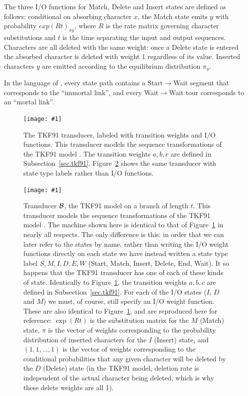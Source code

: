\documentclass{article}
\newcommand{\secref}[1]{Subsection~\ref{sec.#1}}
\newcommand{\figref}[1]{Figure~\ref{Figures.#1}}
\newcommand{\figlabel}[1]{\label{Figures.#1}}
\newcommand{\easyfig}[4]{
\begin{figure}
\texttt{[image: \#1]}
\caption{ \figlabel{#3} #4}
\end{figure}}
\newcommand{\widepdffig}[2]{\easyfig{#1-fig.pdf}{width=\textwidth}{#1}{#2}}
\newcommand\tkf{{\cal B}}
\begin{document}
The three I/O functions for Match, Delete and Insert states are defined as follows:
conditional on absorbing character $x$, the Match state emits  $y$ with probability
$exp(Rt)_{xy}$, where $R$ is the rate matrix governing character substitutions and 
$t$ is the time separating the input and output sequences. 
Characters are all deleted with the same weight: once a Delete state is entered the 
absorbed character is deleted with weight 1 regardless of its value.  
Inserted characters $y$ are emitted according to the equilibrium distribution $\pi_y$.

In the language of \cite{ThorneEtal91}, every state path contains a Start$\to$Wait segment that corresponds to the ``immortal link'',
and every Wait$\to$Wait tour corresponds to an ``mortal link''.

\widepdffig{tkf91}{The TKF91 transducer, labeled with transition weights and I/O functions.  
This transducer models the sequence transformations of the TKF91 model \cite{ThorneEtal91}.
The transition weights $a,b,c$ are defined in \secref{tkf91}.
\figref{tkf91-labeled} shows the same transducer with state type labels rather than I/O functions.}



\widepdffig{tkf91-labeled}{
Transducer $\tkf$, the TKF91 model on a branch of length $t$.
This transducer models the sequence transformations of the TKF91 model \cite{ThorneEtal91}.
The machine shown here is identical to that of \figref{tkf91} in nearly all respects.
The only difference is this: in order that we can later refer to the states by name,
rather than writing the I/O weight functions directly on each state
we have instead written a state type label
 $S,M,I,D,E,W$ (Start, Match, Insert, Delete, End, Wait).
It so happens that the TKF91 transducer has one of each of these kinds of state.
Identically to \figref{tkf91}, the transition weights $a,b,c$ are defined in \secref{tkf91}.
For each of the I/O states ($I$, $D$ and $M$) we must, of course, still specify an I/O weight function.
These are also identical to \figref{tkf91}, and are reproduced here for reference:
 $\exp(Rt)$ is the substitution matrix for the $M$ (Match) state,
 $\pi$ is the vector of weights
  corresponding to the probability distribution of inserted characters for the $I$ (Insert) state,
 and
 $(1,1,\ldots,1)$
 is the vector of weights corresponding to
 the conditional probabilities that any given character will be deleted by the $D$ (Delete) state
 (in the TKF91 model, deletion rate is independent of the actual character being deleted,
 which is why these delete weights are all 1).
}
\end{document}
